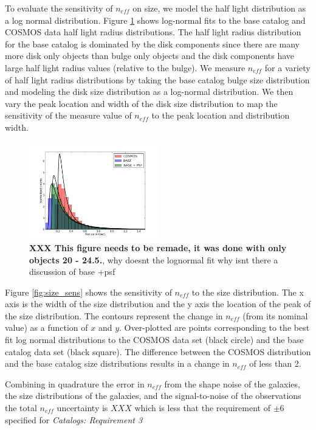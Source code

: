 \documentclass[]{article}
\begin{document}
To evaluate the sensitivity of $n_{eff}$ on size, we model the 
half light distribution as a log normal distribution.  Figure
\ref{fig:ln_fit} shows log-normal fits to the base catalog and COSMOS
data half light radius distributions.  The half light radius
distribution for the base catalog is dominated by the disk components
since there are many more disk only objects than bulge only objects
and the disk components have large half light radius values (relative
to the bulge). We measure $n_{eff}$ for a variety of half light radius
distributions by taking the base catalog bulge size distribution and
modeling the disk size distribution as a log-normal distribution.  We
then vary the peak location and width of the disk size distribution
to map the sensitivity of the measure value of $n_{eff}$ to the peak
location and distribution width.
\begin{figure}[H]
\centering
\includegraphics[width=0.5\textwidth]{validation_figures/ln_fit.png}
\caption{{\bf XXX This figure needs to be remade, it was done with
    only objects 20 - 24.5.}\label{fig:ln_fit}, why doesnt the
  lognormal fit why isnt there a discussion of base +psf}
\end{figure}

Figure \ref{fig:size_sens} shows the sensitivity of $n_{eff}$ to the
size distribution.  The x axis is the width of the size distribution
and the y axis the location of the peak of the size distribution. The
contours represent the change in $n_{eff}$ (from its nominal value) as
a function of $x$ and $y$. Over-plotted are points corresponding to
the best fit log normal distributions to the COSMOS data set (black
circle) and the base catalog data set (black square).  The difference
between the COSMOS distribution and the base catalog size distributions
results in a change in $n_{eff}$ of less than 2. 

Combining in quadrature the error in $n_{eff}$ from the shape noise of
the galaxies, the size distributions of the galaxies, and the
signal-to-noise of the observations the total $n_{eff}$ uncertainty is
$XXX$ which is less that the requirement of  $\pm6$ specified for {\it
  Catalogs:  Requirement 3}
\end{document}
